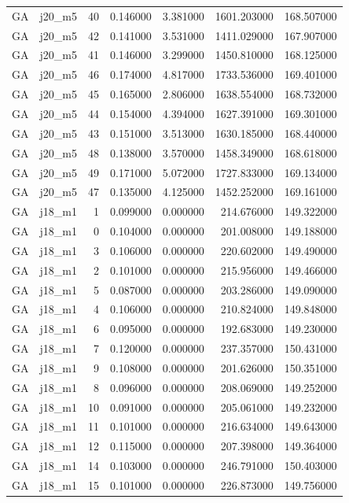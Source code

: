 \begin{tabular}{llrrrrr}
GA & j20_m5 & 40 & 0.146000 & 3.381000 & 1601.203000 & 168.507000 \\
GA & j20_m5 & 42 & 0.141000 & 3.531000 & 1411.029000 & 167.907000 \\
GA & j20_m5 & 41 & 0.146000 & 3.299000 & 1450.810000 & 168.125000 \\
GA & j20_m5 & 46 & 0.174000 & 4.817000 & 1733.536000 & 169.401000 \\
GA & j20_m5 & 45 & 0.165000 & 2.806000 & 1638.554000 & 168.732000 \\
GA & j20_m5 & 44 & 0.154000 & 4.394000 & 1627.391000 & 169.301000 \\
GA & j20_m5 & 43 & 0.151000 & 3.513000 & 1630.185000 & 168.440000 \\
GA & j20_m5 & 48 & 0.138000 & 3.570000 & 1458.349000 & 168.618000 \\
GA & j20_m5 & 49 & 0.171000 & 5.072000 & 1727.833000 & 169.134000 \\
GA & j20_m5 & 47 & 0.135000 & 4.125000 & 1452.252000 & 169.161000 \\
GA & j18_m1 & 1 & 0.099000 & 0.000000 & 214.676000 & 149.322000 \\
GA & j18_m1 & 0 & 0.104000 & 0.000000 & 201.008000 & 149.188000 \\
GA & j18_m1 & 3 & 0.106000 & 0.000000 & 220.602000 & 149.490000 \\
GA & j18_m1 & 2 & 0.101000 & 0.000000 & 215.956000 & 149.466000 \\
GA & j18_m1 & 5 & 0.087000 & 0.000000 & 203.286000 & 149.090000 \\
GA & j18_m1 & 4 & 0.106000 & 0.000000 & 210.824000 & 149.848000 \\
GA & j18_m1 & 6 & 0.095000 & 0.000000 & 192.683000 & 149.230000 \\
GA & j18_m1 & 7 & 0.120000 & 0.000000 & 237.357000 & 150.431000 \\
GA & j18_m1 & 9 & 0.108000 & 0.000000 & 201.626000 & 150.351000 \\
GA & j18_m1 & 8 & 0.096000 & 0.000000 & 208.069000 & 149.252000 \\
GA & j18_m1 & 10 & 0.091000 & 0.000000 & 205.061000 & 149.232000 \\
GA & j18_m1 & 11 & 0.101000 & 0.000000 & 216.634000 & 149.643000 \\
GA & j18_m1 & 12 & 0.115000 & 0.000000 & 207.398000 & 149.364000 \\
GA & j18_m1 & 14 & 0.103000 & 0.000000 & 246.791000 & 150.403000 \\
GA & j18_m1 & 15 & 0.101000 & 0.000000 & 226.873000 & 149.756000 \\

\end{tabular}
